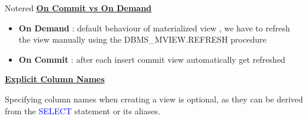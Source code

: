 \vspace{0.25cm}
\begin{prettyBox}{Note}{red}
\textbf{\underline{On Commit vs On Demand}}
\begin{itemize}
    \item \textbf{On Demand} : default behaviour of materialized view , we have to refresh the view
manually using the DBMS\_MVIEW.REFRESH procedure
    \item \textbf{On Commit} : after each insert commit view automatically get refreshed
\end{itemize}

\vspace{0.15cm}

\textbf{\underline{Explicit Column Names}}

\vspace{0.15cm}

Specifying column names when creating a view is optional, as they can be derived from the \textcolor{blue}{SELECT} statement or its aliases.

\end{prettyBox}
